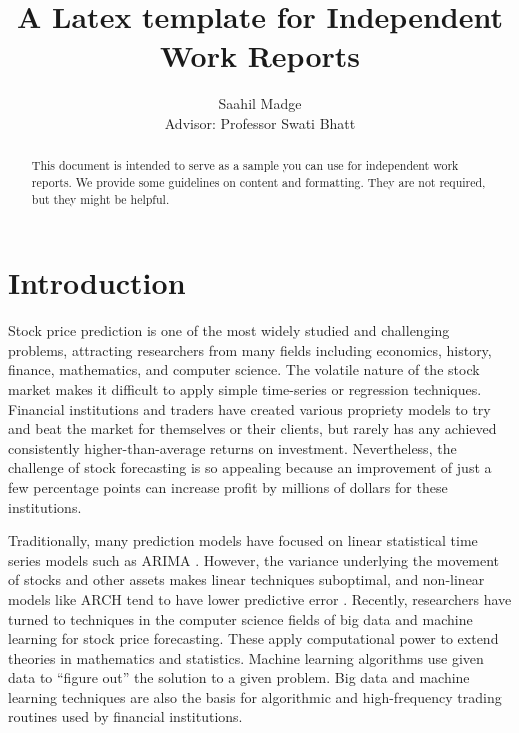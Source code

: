 \documentclass[pageno]{jpaper}
\begin{document}
\title{
A Latex template for Independent Work Reports}
\author{Saahil Madge \\ Advisor: Professor Swati Bhatt}

\date{}
\maketitle

\thispagestyle{empty}

\begin{abstract}
\bigskip
This document is intended to serve as a sample you can use for independent work reports.  We provide some guidelines on content and formatting.  They are not required, but they might be helpful.
\end{abstract}

\section{Introduction}

Stock price prediction is one of the most widely studied and challenging problems, attracting researchers from many fields including economics, history, finance, mathematics, and computer science. The volatile nature of the stock market makes it difficult to apply simple time-series or regression techniques. Financial institutions and traders have created various propriety models to try and beat the market for themselves or their clients, but rarely has any achieved consistently higher-than-average returns on investment. Nevertheless, the challenge of stock forecasting is so appealing because an improvement of just a few percentage points can increase profit by millions of dollars for these institutions.

Traditionally, many prediction models have focused on linear statistical time series models such as ARIMA \cite{bontempi}. However, the variance underlying the movement of stocks and other assets makes linear techniques suboptimal, and non-linear models like ARCH tend to have lower predictive error \cite{zhang}. Recently, researchers have turned to techniques in the computer science fields of big data and machine learning for stock price forecasting. These apply computational power to extend theories in mathematics and statistics. Machine learning algorithms use given data to ``figure out'' the solution to a given problem. Big data and machine learning techniques are also the basis for algorithmic and high-frequency trading routines used by financial institutions.
\end{document}
